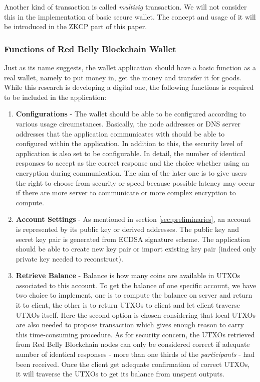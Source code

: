 \documentclass[12pt]{article}
\begin{document}
Another kind of transaction is called \textit{multisig} transaction. We will not consider this in the implementation of basic secure wallet. The concept and usage of it will be introduced in the ZKCP part of this paper.

\subsubsection{Functions of Red Belly Blockchain Wallet}

Just as its name suggests, the wallet application should have a basic function as a real wallet, namely to put money in, get the money and transfer it for goods. While this research is developing a digital one, the following functions is required to be included in the application:

\begin{enumerate}
   \item \textbf{Configurations} - The wallet should be able to be configured according to various usage circumstances. Basically, the node addresses or DNS server addresses that the application communicates with should be able to configured within the application. In addition to this, the security level of application is also set to be configurable. In detail, the number of identical responses to accept as the correct response and the choice whether using an encryption during communication. The aim of the later one is to give users the right to choose from security or speed because possible latency may occur if there are more server to communicate or more complex encryption to compute.

   \item \textbf{Account Settings} - As mentioned in section \ref{sec:preliminaries}, an account is represented by its public key or derived addresses. The public key and secret key pair is generated from ECDSA signature scheme. The application should be able to create new key pair or import existing key pair (indeed only private key needed to reconstruct).
    
   \item \textbf{Retrieve Balance} - Balance is how many coins are available in UTXOs associated to this account. To get the balance of one specific account, we have two choice to implement, one is to compute the balance on server and return it to client, the other is to return UTXOs to client and let client traverse UTXOs itself. Here the second option is chosen considering that local UTXOs are also needed to propose transaction which gives enough reason to carry this time-consuming procedure. As for security concern, the UTXOs retrieved from Red Belly Blockchain nodes can only be considered correct if adequate number of identical responses - more than one thirds of the \textit{participants} - had been received. Once the client get adequate confirmation of correct UTXOs, it will traverse the UTXOs to get its balance from unspent outputs.


\end{enumerate}
\end{document}
